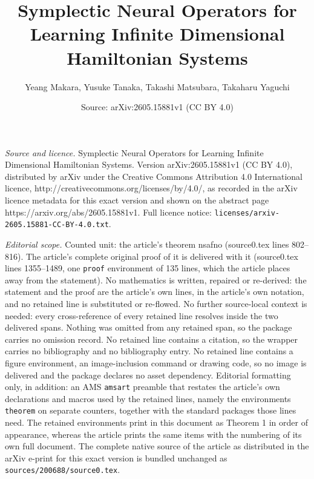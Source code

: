\documentclass[10pt,a4paper]{amsart}
\title{Symplectic Neural Operators for Learning Infinite Dimensional Hamiltonian Systems}
\author{Yeang Makara, Yusuke Tanaka, Takashi Matsubara, Takaharu Yaguchi}
\date{Source: arXiv:2605.15881v1 (CC BY 4.0)}
\begin{document}
\maketitle

\noindent\emph{Source and licence.} Symplectic Neural Operators for Learning Infinite Dimensional Hamiltonian Systems. Version arXiv:2605.15881v1 (CC BY 4.0), distributed by arXiv under the Creative Commons Attribution 4.0 International licence, http://creativecommons.org/licenses/by/4.0/, as recorded in the arXiv licence metadata for this exact version and shown on the abstract page https://arxiv.org/abs/2605.15881v1. Full licence notice: \texttt{licenses/arxiv-2605.15881-CC-BY-4.0.txt}.\par\smallskip

\noindent\textit{Editorial scope.} Counted unit: the article's theorem nsafno (source0.tex lines 802--816). The article's complete original proof of it is delivered with it (source0.tex lines 1355--1489, one \texttt{proof} environment of 135 lines, which the article places away from the statement). No mathematics is written, repaired or re-derived: the statement and the proof are the article's own lines, in the article's own notation, and no retained line is substituted or re-flowed.  No further source-local context is needed: every cross-reference of every retained line resolves inside the two delivered spans.  Nothing was omitted from any retained span, so the package carries no omission record.  No retained line contains a citation, so the wrapper carries no bibliography and no bibliography entry.  No retained line contains a figure environment, an image-inclusion command or drawing code, so no image is delivered and the package declares no asset dependency.  Editorial formatting only, in addition: an AMS \texttt{amsart} preamble that restates the article's own declarations and macros used by the retained lines, namely the environments \texttt{theorem} on separate counters, together with the standard packages those lines need.  The retained environments print in this document as Theorem 1 in order of appearance, whereas the article prints the same items with the numbering of its own full document.  The complete native source of the article as distributed in the arXiv e-print for this exact version is bundled unchanged as \texttt{sources/200688/source0.tex}.
\end{document}
